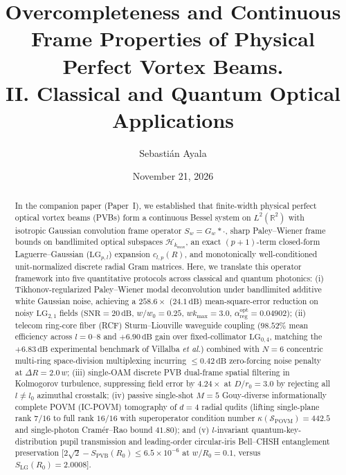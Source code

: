 \documentclass[aps,pra,onecolumn,notitlepage,11pt,tightenlines,nofootinbib,floatfix,longbibliography]{revtex4-2}
\begin{document}
\title{Overcompleteness and Continuous Frame Properties of Physical Perfect Vortex Beams.\\II. Classical and Quantum Optical Applications}

\author{Sebasti\'an Ayala}

\date{November 21, 2026}

\begin{abstract}
In the companion paper (Paper~I), we established that finite-width physical perfect optical vortex beams (PVBs) form a continuous Bessel system on $L^2(\mathbb{R}^2)$ with isotropic Gaussian convolution frame operator $S_w = G_w * \cdot$, sharp Paley--Wiener frame bounds on bandlimited optical subspaces $\mathcal{H}_{k_{\max}}$, an exact $(p+1)$-term closed-form Laguerre--Gaussian ($\mathrm{LG}_{p,l}$) expansion $c_{l,p}(R)$, and monotonically well-conditioned unit-normalized discrete radial Gram matrices. Here, we translate this operator framework into five quantitative protocols across classical and quantum photonics: (i) Tikhonov-regularized Paley--Wiener modal deconvolution under bandlimited additive white Gaussian noise, achieving a $258.6\times$ ($24.1\,\mathrm{dB}$) mean-square-error reduction on noisy $\mathrm{LG}_{2,1}$ fields ($\mathrm{SNR} = 20\,\mathrm{dB}$, $w/w_0 = 0.25$, $w k_{\max} = 3.0$, $\alpha_{\mathrm{reg}}^{\mathrm{opt}} = 0.04902$); (ii) telecom ring-core fiber (RCF) Sturm--Liouville waveguide coupling ($98.52\%$ mean efficiency across $l = 0\text{--}8$ and $+6.90\,\mathrm{dB}$ gain over fixed-collimator $\mathrm{LG}_{0,4}$, matching the $+6.83\,\mathrm{dB}$ experimental benchmark of Villalba \emph{et al.}) combined with $N = 6$ concentric multi-ring space-division multiplexing incurring $\le 0.42\,\mathrm{dB}$ zero-forcing noise penalty at $\Delta R = 2.0\,w$; (iii) single-OAM discrete PVB dual-frame spatial filtering in Kolmogorov turbulence, suppressing field error by $4.24\times$ at $D/r_0 = 3.0$ by rejecting all $l \neq l_0$ azimuthal crosstalk; (iv) passive single-shot $M = 5$ Gouy-diverse informationally complete POVM (IC-POVM) tomography of $d = 4$ radial qudits (lifting single-plane rank $7/16$ to full rank $16/16$ with superoperator condition number $\kappa(\mathcal{S}_{\mathrm{POVM}}) = 442.5$ and single-photon Cram\'er--Rao bound $41.80$); and (v) $l$-invariant quantum-key-distribution pupil transmission and leading-order circular-iris Bell--CHSH entanglement preservation [$2\sqrt{2} - S_{\mathrm{PVB}}(R_0) \le 6.5\times 10^{-6}$ at $w/R_0 = 0.1$, versus $S_{\mathrm{LG}}(R_0) = 2.0008$].
\end{abstract}
\end{document}
